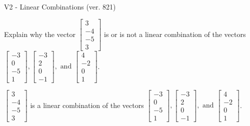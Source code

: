 \begin{exercise}
  \begin{exerciseTitle}V2 - Linear Combinations (ver. 821)\end{exerciseTitle}
  \begin{exerciseStatement}
    Explain why the vector \(\left[\begin{array}{c}
3 \\
-4 \\
-5 \\
3
\end{array}\right]\)  is or is not a linear 
	combination of the vectors \(\left[\begin{array}{c}
-3 \\
0 \\
-5 \\
1
\end{array}\right] , \left[\begin{array}{c}
-3 \\
2 \\
0 \\
-1
\end{array}\right] , \text{ and } \left[\begin{array}{c}
4 \\
-2 \\
0 \\
1
\end{array}\right]\).
	


  \end{exerciseStatement}
  \begin{exerciseAnswer}
   \(\left[\begin{array}{c}
3 \\
-4 \\
-5 \\
3
\end{array}\right]\) 
  	 is  
	a linear combination of the vectors \(\left[\begin{array}{c}
-3 \\
0 \\
-5 \\
1
\end{array}\right] , \left[\begin{array}{c}
-3 \\
2 \\
0 \\
-1
\end{array}\right] , \text{ and } \left[\begin{array}{c}
4 \\
-2 \\
0 \\
1
\end{array}\right]\).

	
  


  \end{exerciseAnswer}
\end{exercise}